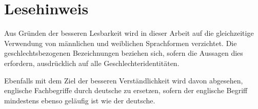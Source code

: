 \chapter*{Lesehinweis}
\thispagestyle{empty}

Aus Gründen der besseren Lesbarkeit wird in dieser Arbeit auf die gleichzeitige
Verwendung von männlichen und weiblichen Sprachformen verzichtet. Die geschlechtsbezogenen Bezeichnungen beziehen sich, sofern die Aussagen dies erfordern,
ausdrücklich auf alle Geschlechteridentitäten.\par
Ebenfalls mit dem Ziel der besseren Verständlichkeit wird davon abgesehen, englische Fachbegriffe durch deutsche zu ersetzen, sofern der englische Begriff
mindestens ebenso geläufig ist wie der deutsche.
